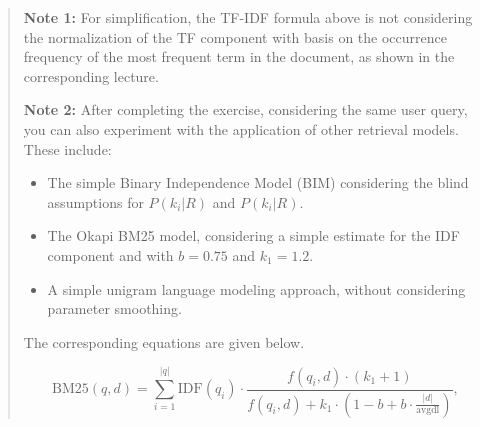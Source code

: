 \documentclass[12pt]{article}
\begin{document}
\begin{quote}
    \textbf{Note 1:} For simplification, the TF-IDF formula above is not considering the normalization of the TF component with basis on the occurrence frequency of the most frequent term in the document, as shown in the corresponding lecture.
    
    \textbf{Note 2:} After completing the exercise, considering the same user query, you can also experiment with the application of other retrieval models. These include:
    \begin{itemize}
    \item The simple Binary Independence Model (BIM) considering the blind assumptions for $P(k_i|R)$ and $P(k_i|R)$.
    \item The Okapi BM25 model, considering a simple estimate for the IDF component and with $b=0.75$ and $k_1=1.2$.
    \item A simple unigram language modeling approach, without considering parameter smoothing.
    \end{itemize}
    The corresponding equations are given below.
    
    \begin{center}
    \begin{equation*}
{ {\text{BM25}}(q,d)=\sum _{i=1}^{|q|}{\text{IDF}}(q_{i})\cdot {\frac {f(q_{i},d)\cdot (k_{1}+1)}{f(q_{i},d)+k_{1}\cdot \left(1-b+b\cdot {\frac {|d|}{\text{avgdl}}}\right)}},}
    \end{equation*}
    \end{center}
    
\end{quote}
\end{document}
